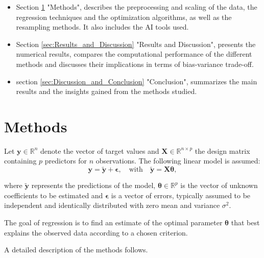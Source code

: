 \documentclass[
 reprint,            %
 amsmath,amssymb,
 aps,
]{revtex4-2}
\begin{document}
\begin{itemize}
    \item Section \ref{sec:Methods} "Methods", describes the preprocessing and scaling of the data, the regression techniques and the optimization algorithms, as well as the resampling methods. It also includes the AI tools used.
    \item Section \ref{sec:Results_and_Discussion} "Results and Discussion", presents the numerical results, compares the computational performance of the different methods and discusses their implications in terms of bias-variance trade-off.
    \item section \ref{sec:Discussion_and_Conclusion} "Conclusion", summarizes the main results and the insights gained from the methods studied.
\end{itemize}


\section{Methods}
\label{sec:Methods}
 Let $\mathbf{y} \in \mathbb{R}^n$ denote the vector of target values and $\mathbf{X} \in \mathbb{R}^{n \times p}$ the design matrix containing $p$ predictors for $n$ observations.
 The following linear model is assumed:
$$
\mathbf{y} = \tilde{\mathbf{y}} + \boldsymbol{\epsilon}, \quad \text{with} \quad \tilde{\mathbf{y}} = \mathbf{X}\boldsymbol{\theta},
$$

where $\tilde{\mathbf{y}}$ represents the predictions of the model, $\boldsymbol{\theta} \in \mathbb{R}^p$ is the vector of unknown coefficients to be estimated and $\boldsymbol{\epsilon}$ is a vector of errors, typically assumed to be independent and identically distributed with zero mean and variance $\sigma^2$.

The goal of regression is to find an estimate of the optimal parameter $\boldsymbol{\theta}$ that best explains the observed data according to a chosen criterion. 

A detailed description of the methods follows.
\end{document}
